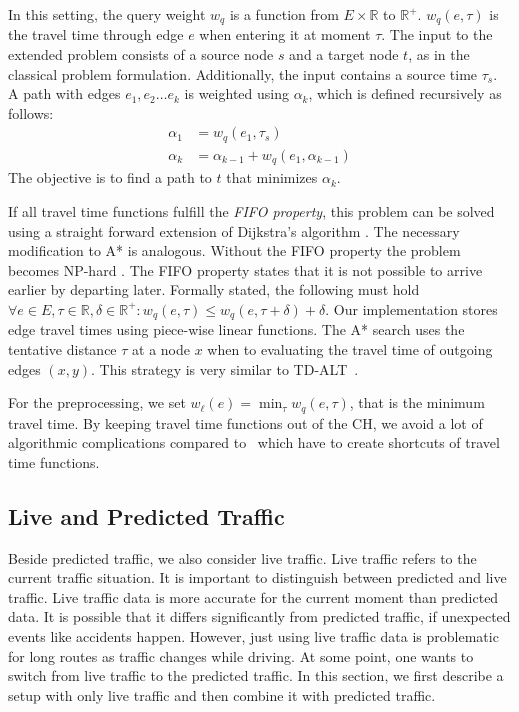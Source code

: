 \documentclass[a4paper,USenglish,cleveref, autoref, thm-restate]{lipics-v2019}
\begin{document}
In this setting, the query weight $w_q$ is a function from $E\times \mathbb{R}$ to $\mathbb{R}^+$.
$w_q(e, \tau)$ is the travel time through edge $e$ when entering it at moment $\tau$.
The input to the extended problem consists of a source node $s$ and a target node $t$, as in the classical problem formulation.
Additionally, the input contains a source time $\tau_s$.
A path with edges $e_1,e_2\ldots e_k$ is weighted using $\alpha_k$, which is defined recursively as follows:\[
\begin{split}
\alpha_{1} & = w_q(e_1, \tau_s) \\
\alpha_{k} & = \alpha_{k-1} + w_q(e_1, \alpha_{k-1})
\end{split}
\]
The objective is to find a path to $t$ that minimizes $\alpha_k$.

If all travel time functions fulfill the \emph{FIFO property}, this problem can be solved using a straight forward extension of Dijkstra's algorithm \cite{d-aassp-69}.
The necessary modification to A* is analogous.
Without the FIFO property the problem becomes NP-hard \cite{or-tnp-89}.
The FIFO property states that it is not possible to arrive earlier by departing later.
Formally stated, the following must hold $\forall e\in E,\tau\in \mathbb{R},\delta\in \mathbb{R}^+: w_q(e, \tau) \le w_q(e, \tau+\delta) + \delta$.
Our implementation stores edge travel times using piece-wise linear functions.
The A* search uses the tentative distance $\tau$ at a node $x$ when to evaluating the travel time of outgoing edges $(x,y)$.
This strategy is very similar to TD-ALT~\cite{ndls-bastd-12,dw-lbrdg-07}.

For the preprocessing, we set $w_\ell(e) = \min_\tau w_q(e,\tau)$, that is the minimum travel time.
By keeping travel time functions out of the CH, we avoid a lot of algorithmic complications compared to~\cite{bgsv-mtdtt-13,bdpw-dtdrp-16,swz-sfert-20,dn-crdtd-12} which have to create shortcuts of travel time functions.

\subsection{Live and Predicted Traffic}
\label{sec:live-predicted-traffic}

Beside predicted traffic, we also consider live traffic.
Live traffic refers to the current traffic situation.
It is important to distinguish between predicted and live traffic.
Live traffic data is more accurate for the current moment than predicted data.
It is possible that it differs significantly from predicted traffic, if unexpected events like accidents happen.
However, just using live traffic data is problematic for long routes as traffic changes while driving.
At some point, one wants to switch from live traffic to the predicted traffic.
In this section, we first describe a setup with only live traffic and then combine it with predicted traffic.
\end{document}
